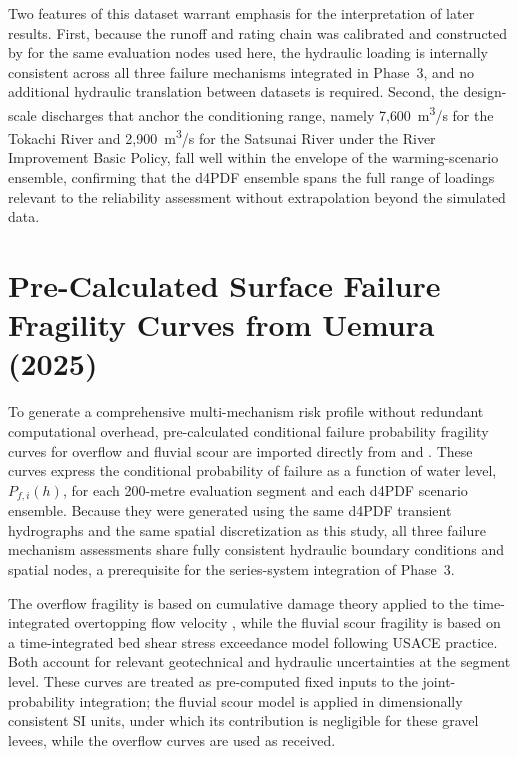Two features of this dataset warrant emphasis for the interpretation of later results. First, because the runoff and rating chain was calibrated and constructed by \textcite{uemura_phd_2025} for the same evaluation nodes used here, the hydraulic loading is internally consistent across all three failure mechanisms integrated in Phase~3, and no additional hydraulic translation between datasets is required. Second, the design-scale discharges that anchor the conditioning range, namely 7{,}600~m\textsuperscript{3}/s for the Tokachi River and 2{,}900~m\textsuperscript{3}/s for the Satsunai River under the River Improvement Basic Policy, fall well within the envelope of the warming-scenario ensemble, confirming that the d4PDF ensemble spans the full range of loadings relevant to the reliability assessment without extrapolation beyond the simulated data.

\section{Pre-Calculated Surface Failure Fragility Curves from Uemura (2025)} \label{sec: Pre-Calculated Surface Failure Fragility Curves from Uemura (2025)}

To generate a comprehensive multi-mechanism risk profile without redundant computational overhead, pre-calculated conditional failure probability fragility curves for overflow and fluvial scour are imported directly from \textcite{uemura_phd_2025} and \textcite{uemura_wp2_2024}. These curves express the conditional probability of failure as a function of water level, $P_{f,i}(h)$, for each 200-metre evaluation segment and each d4PDF scenario ensemble. Because they were generated using the same d4PDF transient hydrographs and the same spatial discretization as this study, all three failure mechanism assessments share fully consistent hydraulic boundary conditions and spatial nodes, a prerequisite for the series-system integration of Phase~3.

The overflow fragility is based on cumulative damage theory applied to the time-integrated overtopping flow velocity \parencite{dean_2010}, while the fluvial scour fragility is based on a time-integrated bed shear stress exceedance model following USACE practice. Both account for relevant geotechnical and hydraulic uncertainties at the segment level. These curves are treated as pre-computed fixed inputs to the joint-probability integration; the fluvial scour model is applied in dimensionally consistent SI units, under which its contribution is negligible for these gravel levees, while the overflow curves are used as received.

